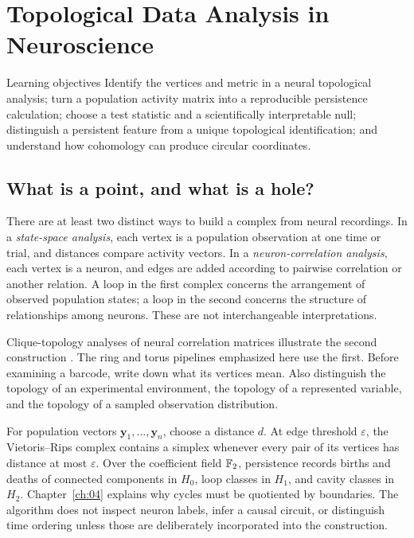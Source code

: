 \chapter{Topological Data Analysis in Neuroscience}\label{ch:09}

\begin{insight}{Learning objectives}
Identify the vertices and metric in a neural topological analysis; turn a population activity matrix into a reproducible persistence calculation; choose a test statistic and a scientifically interpretable null; distinguish a persistent feature from a unique topological identification; and understand how cohomology can produce circular coordinates.
\end{insight}

\section{What is a point, and what is a hole?}
There are at least two distinct ways to build a complex from neural recordings. In a \emph{state-space analysis}, each vertex is a population observation at one time or trial, and distances compare activity vectors. In a \emph{neuron-correlation analysis}, each vertex is a neuron, and edges are added according to pairwise correlation or another relation. A loop in the first complex concerns the arrangement of observed population states; a loop in the second concerns the structure of relationships among neurons. These are not interchangeable interpretations.

Clique-topology analyses of neural correlation matrices illustrate the second construction \citep{app_giusti2015}. The ring and torus pipelines emphasized here use the first. Before examining a barcode, write down what its vertices mean. Also distinguish the topology of an experimental environment, the topology of a represented variable, and the topology of a sampled observation distribution.

For population vectors $\mathbf y_1,\ldots,\mathbf y_n$, choose a distance $d$. At edge threshold $\varepsilon$, the Vietoris--Rips complex contains a simplex whenever every pair of its vertices has distance at most $\varepsilon$. Over the coefficient field $\mathbb{F}_2$, persistence records births and deaths of connected components in $H_0$, loop classes in $H_1$, and cavity classes in $H_2$. Chapter~\ref{ch:04} explains why cycles must be quotiented by boundaries. The algorithm does not inspect neuron labels, infer a causal circuit, or distinguish time ordering unless those are deliberately incorporated into the construction.

